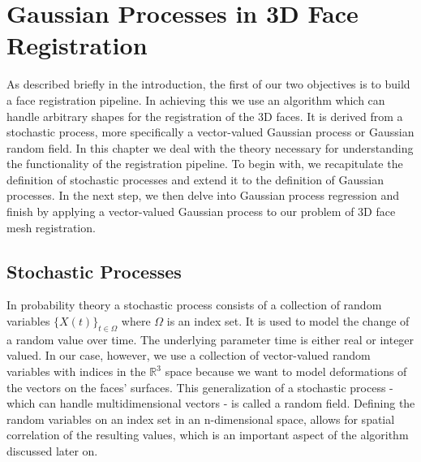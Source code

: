 \chapter{Gaussian Processes in 3D Face Registration}
As described briefly in the introduction, the first of our two objectives is to build a face registration pipeline. In achieving this we use an algorithm which can handle arbitrary shapes for the registration of the 3D faces. It is derived from a stochastic process, more specifically a vector-valued Gaussian process or Gaussian random field. In this chapter we deal with the theory necessary for understanding the functionality of the registration pipeline. To begin with, we recapitulate the definition
of stochastic processes and extend it to the definition of Gaussian processes. In the next step, we then delve into Gaussian process regression and finish by applying a vector-valued Gaussian process to our problem of 3D face mesh registration.

\section{Stochastic Processes}

In probability theory a stochastic process consists of a collection of random variables $\{X(t)\}_{t \in \Omega}$ where $\Omega$ is an index set. It is used to model the change of a random value over time. The underlying parameter time is either real or integer valued. In our case, however, we use a collection of vector-valued random variables with indices in the $\mathbb{R}^{3}$ space because we want to model deformations of the vectors on the faces' surfaces. This
generalization of a stochastic process -  
which can handle multidimensional vectors - is called a random field. Defining the random variables on an index set in an n-dimensional space, allows for spatial correlation of the resulting values, which is an important aspect of the algorithm discussed later on.

